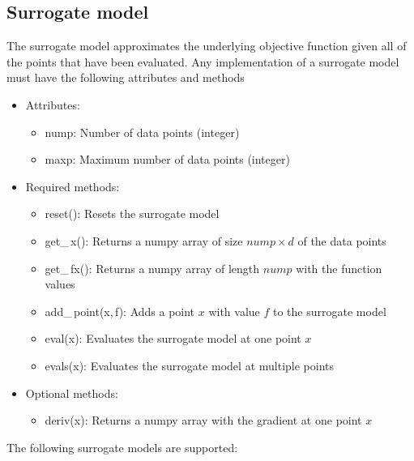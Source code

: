 \documentclass[]{article}
\begin{document}
\subsection{Surrogate model} 
\label{surrogate}
The surrogate model approximates the underlying objective function given all of the 
points that have been evaluated. Any implementation of a surrogate model must 
have the following attributes and methods
\begin{itemize}
\item[] {Attributes}: 
\begin{itemize}
\item nump: Number of data points (integer)
\item maxp: Maximum number of data points (integer)
\end{itemize}
\item[] {Required methods}:
\begin{itemize}
\item reset(): Resets the surrogate model
\item get\_\,x(): Returns a numpy array of size $nump \times d$ of the data points
\item get\_\,fx(): Returns a numpy array of length $nump$ with the function values
\item add\_\,point(x,\,f): Adds a point $x$ with value $f$ to the surrogate model
\item eval(x): Evaluates the surrogate model at one point $x$
\item evals(x): Evaluates the surrogate model at multiple points
\end{itemize}
\item[] {Optional methods}:
\begin{itemize}
\item deriv(x): Returns a numpy array with the gradient at one point $x$
\end{itemize}
\end{itemize}
The following surrogate models are supported:
\end{document}
